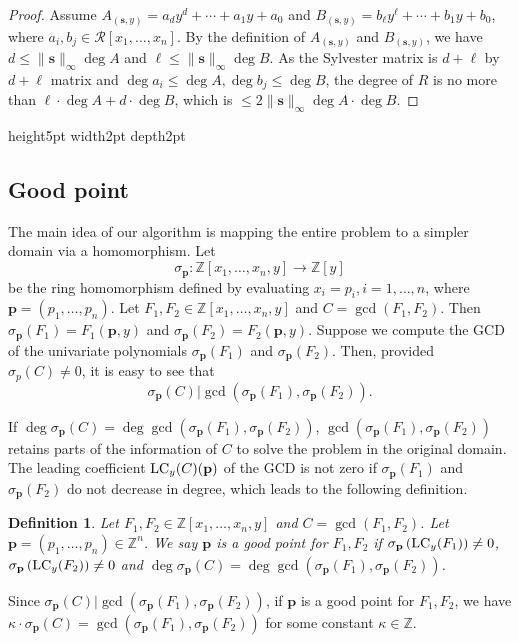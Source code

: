 \documentclass[final,20pt]{elsarticle}
\newtheorem{definition}[theorem]{Definition}
\def\Z{{\mathbb Z}}
\def\LC{\hbox{\rm{LC}}}
\def\qed{\hfil {\vrule height5pt width2pt depth2pt}}
\begin{document}
\begin{proof}
Assume $A_{(\mathbf{s},y)}=a_dy^d+\cdots+a_1y+a_0$ and $B_{(\mathbf{s},y)}=b_{\ell}y^{\ell}+\cdots+b_1y+b_0$, where $a_i,b_j\in \mathcal{R}[x_1,\dots,x_n]$. By the definition of $A_{(\mathbf{s},y)}$ and $B_{(\mathbf{s},y)}$, we have $d\leq \|\mathbf{s}\|_{\infty}\deg A$ and $\ell\leq \|\mathbf{s}\|_{\infty}\deg B$. As the Sylvester matrix is $d+\ell$ by $d+\ell$ matrix and $\deg a_i\leq \deg A,\deg b_j\leq \deg B$, the degree of $R$ is no more than $\ell\cdot \deg A+d\cdot \deg B$, which is $\leq 2\|\mathbf{s}\|_{\infty}\deg A\cdot\deg B$.
\end{proof}\qed


\subsection{Good point}
The main idea of our algorithm is mapping the entire problem to a simpler
domain via a homomorphism. Let
$$\sigma_\mathbf{p}:\Z[x_1,\dots,x_n,y]\rightarrow \Z[y]$$
be the ring homomorphism defined by evaluating $x_i=p_i,i=1,\dots,n$, where $\mathbf{p}=(p_1,\dots,p_n)$.
%
Let $F_1,F_2\in \Z[x_1,\dots,x_n,y]$ and $C=\gcd(F_1,F_2)$. Then $\sigma_\mathbf{p}(F_1)=F_1(\mathbf{p},y)$ and $\sigma_\mathbf{p}(F_2)=F_2(\mathbf{p},y)$. Suppose we compute the GCD of the univariate polynomials $\sigma_\mathbf{p}(F_1)$ and $\sigma_\mathbf{p}(F_2)$. Then, provided $\sigma_p(C) \ne 0$, it is
easy to see that
$$\sigma_\mathbf{p}(C)|\gcd(\sigma_\mathbf{p}(F_1),\sigma_\mathbf{p}(F_2)).$$

If $\deg\sigma_\mathbf{p}(C)=\deg\gcd(\sigma_\mathbf{p}(F_1),\sigma_\mathbf{p}(F_2))$,
$\gcd(\sigma_\mathbf{p}(F_1),\sigma_\mathbf{p}(F_2))$ retains parts of the information of $C$ to solve the problem in the original domain.
%
The leading coefficient $\LC_y(C)(\mathbf{p})$ of the GCD is not zero
   if $\sigma_\mathbf{p}(F_1)$ and $\sigma_\mathbf{p}(F_2)$ do not
decrease in degree, which leads to the following definition.
%

\begin{definition}\label{def-2}
Let $F_1,F_2\in \Z[x_1,\dots,x_n,y]$ and $C=\gcd(F_1,F_2)$. Let $\mathbf{p}=(p_1,\dots,p_n)\in\Z^n$. We say $\mathbf{p}$ is a {\em good point} for $F_1,F_2$ if $\sigma_{\mathbf{p}}\left( \LC_y(F_1) \right) \neq 0$, $\sigma_{\mathbf{p}}\left( \LC_y(F_2) \right) \neq 0$ and $\deg \sigma_\mathbf{p}(C) =\deg \gcd(\sigma_\mathbf{p}(F_1),\sigma_\mathbf{p}(F_2))$.
\end{definition}

Since $\sigma_\mathbf{p}(C)|\gcd(\sigma_\mathbf{p}(F_1),\sigma_\mathbf{p}(F_2))$,
if $\mathbf{p}$ is a good point for $F_1,F_2$, we have $\kappa\cdot\sigma_\mathbf{p}(C)=\gcd(\sigma_\mathbf{p}(F_1),\sigma_\mathbf{p}(F_2))$ for some constant $\kappa\in\mathbb{Z}$.
%
\end{document}
